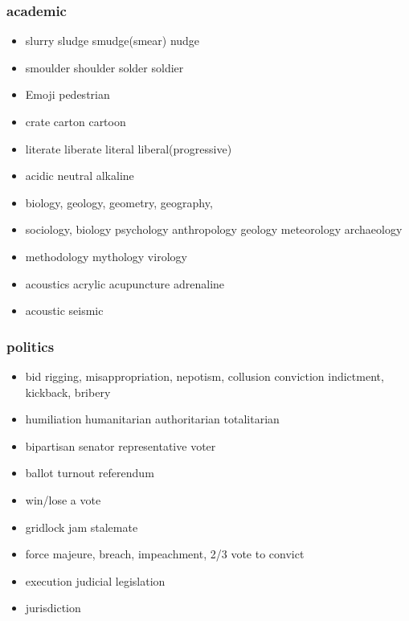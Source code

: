 \documentclass[a4paper,11pt,twoside]{book}
\begin{document}
\subsubsection{academic}
\begin{itemize}
	\item slurry sludge smudge(smear) nudge
	
	\item smoulder shoulder solder soldier
	
	\item Emoji pedestrian 
	
	\item crate carton cartoon
	
	\item literate liberate literal liberal(progressive)
	
	\item acidic neutral alkaline

	\item biology, geology, geometry, geography,
	
	\item sociology, biology psychology anthropology geology meteorology archaeology
	
	\item methodology mythology virology
	
	\item acoustics acrylic acupuncture adrenaline
	
	\item acoustic seismic 
\end{itemize}

\subsubsection{politics}	
\begin{itemize}
	\item bid rigging, misappropriation, nepotism, collusion conviction indictment, kickback, bribery 
	
    \item humiliation humanitarian authoritarian totalitarian 
 
	\item bipartisan senator representative voter
	
	\item ballot turnout referendum 
	
	\item win/lose a vote 
	
	\item gridlock jam stalemate
	
	\item force majeure, breach, impeachment, 2/3 vote to convict
	
	\item execution judicial legislation
	
	\item jurisdiction 
	
\end{itemize}
\end{document}
